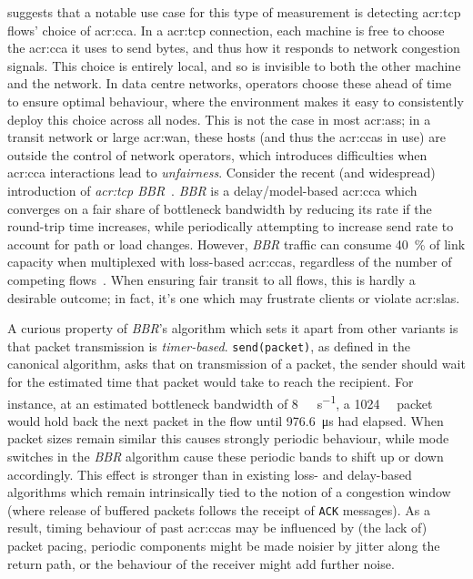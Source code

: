 

 suggests that a notable use case for this type of measurement is detecting \gls{acr:tcp} flows' choice of \gls{acr:cca}.
In a \gls{acr:tcp} connection, each machine is free to choose the \gls{acr:cca} it uses to send bytes, and thus how it responds to network congestion signals.
This choice is entirely local, and so is invisible to both the other machine and the network.
In data centre networks, operators choose these ahead of time to ensure optimal behaviour, where the environment makes it easy to consistently deploy this choice across all nodes.
This is not the case in most \glspl{acr:as}; in a transit network or large \gls{acr:wan}, these hosts (and thus the \glspl{acr:cca} in use) are outside the control of network operators, which introduces difficulties when \gls{acr:cca} interactions lead to \emph{unfairness}.
Consider the recent (and widespread) introduction of \emph{\gls{acr:tcp} BBR}~\parencite{DBLP:journals/queue/CardwellCGYJ16}.
\emph{BBR} is a delay/model-based \gls{acr:cca} which converges on a fair share of bottleneck bandwidth by reducing its rate if the round-trip time increases, while periodically attempting to increase send rate to account for path or load changes.
However, \emph{BBR} traffic can consume \qty{40}{\percent} of link capacity when multiplexed with loss-based \glspl{acr:cca}, regardless of the number of competing flows~\parencite{DBLP:conf/imc/WareMSS19}. 
When ensuring fair transit to all flows, this is hardly a desirable outcome; in fact, it's one which may frustrate clients or violate \glspl{acr:sla}.

A curious property of \emph{BBR}'s algorithm which sets it apart from other variants is that packet transmission is \emph{timer-based}.
\texttt{send(packet)}, as defined in the canonical algorithm, asks that on transmission of a packet, the sender should wait for the estimated time that packet would take to reach the recipient.
For instance, at an estimated bottleneck bandwidth of \qty{8}{\mega\bit\per\second}, a \qty{1024}{\kilo\byte} packet would hold back the next packet in the flow until \qty{976.6}{\micro\second} had elapsed.
When packet sizes remain similar this causes strongly periodic behaviour, while mode switches in the \emph{BBR} algorithm cause these periodic bands to shift up or down accordingly.
This effect is stronger than in existing loss- and delay-based algorithms which remain intrinsically tied to the notion of a congestion window (where release of buffered packets follows the receipt of \texttt{ACK} messages).
As a result, timing behaviour of past \glspl{acr:cca} may be influenced by (the lack of) packet pacing, periodic components might be made noisier by jitter along the return path, or the behaviour of the receiver might add further noise.

